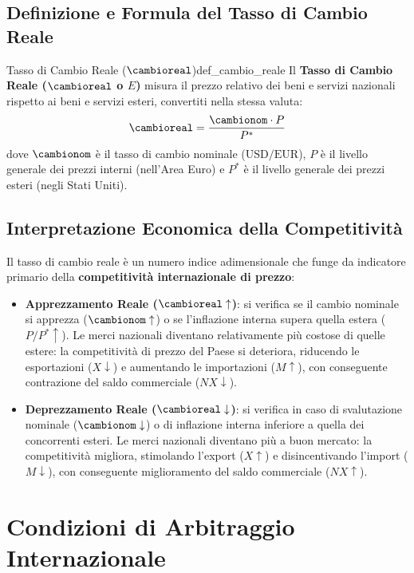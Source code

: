 \subsection{Definizione e Formula del Tasso di Cambio Reale}

\begin{definizione}{Tasso di Cambio Reale ($\cambioreal$)}{def_cambio_reale}
Il \textbf{Tasso di Cambio Reale ($\cambioreal$ o $E$)} misura il prezzo relativo dei beni e servizi nazionali rispetto ai beni e servizi esteri, convertiti nella stessa valuta:
\begin{equation}
    \cambioreal = \frac{\cambionom \cdot P}{P^*} \label{eq:cambio_reale}
\end{equation}
dove $\cambionom$ è il tasso di cambio nominale ($\text{USD/EUR}$), $P$ è il livello generale dei prezzi interni (nell'Area Euro) e $P^*$ è il livello generale dei prezzi esteri (negli Stati Uniti).
\end{definizione}

\subsection{Interpretazione Economica della Competitività}
Il tasso di cambio reale è un numero indice adimensionale che funge da indicatore primario della \textbf{competitività internazionale di prezzo}:
\begin{itemize}
    \item \textbf{Apprezzamento Reale ($\cambioreal \uparrow$)}: si verifica se il cambio nominale si apprezza ($\cambionom \uparrow$) o se l'inflazione interna supera quella estera ($P/P^* \uparrow$). Le merci nazionali diventano relativamente più costose di quelle estere: la competitività di prezzo del Paese si deteriora, riducendo le esportazioni ($X \downarrow$) e aumentando le importazioni ($M \uparrow$), con conseguente contrazione del saldo commerciale ($NX \downarrow$).
    \item \textbf{Deprezzamento Reale ($\cambioreal \downarrow$)}: si verifica in caso di svalutazione nominale ($\cambionom \downarrow$) o di inflazione interna inferiore a quella dei concorrenti esteri. Le merci nazionali diventano più a buon mercato: la competitività migliora, stimolando l'export ($X \uparrow$) e disincentivando l'import ($M \downarrow$), con conseguente miglioramento del saldo commerciale ($NX \uparrow$).
\end{itemize}

\section{Condizioni di Arbitraggio Internazionale}


